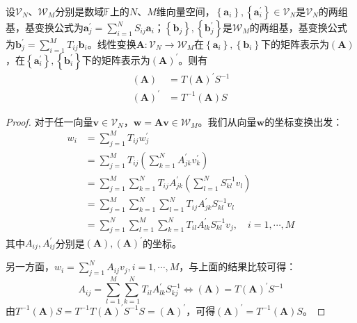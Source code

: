 \documentclass[main.tex]{subfiles}
\begin{document}
\begin{theorem}\label{II.4.14}
设$\mathcal{V}_N$、$\mathcal{W}_M$分别是数域$\mathbb{F}$上的$N$、$M$维向量空间，$\left\{\mathbf{a}_i\right\},\left\{\mathbf{a}^\prime_i\right\}\in\mathcal{V}_N$是$\mathcal{V}_N$的两组基，基变换公式为$\mathbf{a}^\prime_j=\sum_{i=1}^NS_{ij}\mathbf{a}_i$；$\left\{\mathbf{b}_j\right\},\left\{\mathbf{b}^\prime_j\right\}$是$\mathcal{W}_M$的两组基，基变换公式为$\mathbf{b}^\prime_j=\sum_{i=1}^MT_{ij}\mathbf{b}_i$。线性变换$\mathbf{A}:\mathcal{V}_N\rightarrow\mathcal{W}_M$在$\left\{\mathbf{a}_i\right\},\left\{\mathbf{b}_i\right\}$下的矩阵表示为$\left(\mathbf{A}\right)$，在$\left\{\mathbf{a}^\prime_i\right\},\left\{\mathbf{b}^\prime_i\right\}$下的矩阵表示为$\left(\mathbf{A}\right)^\prime$。则有
\begin{align*}
    \left(\mathbf{A}\right)&=T\left(\mathbf{A}\right)^\prime S^{-1}\\
    \left(\mathbf{A}\right)^\prime&=T^{-1}\left(\mathbf{A}\right)S
\end{align*}
\end{theorem}
\begin{proof}
对于任一向量$\mathbf{v}\in\mathcal{V}_N$，$\mathbf{w}=\mathbf{Av}\in\mathcal{W}_M$。我们从向量$\mathbf{w}$的坐标变换出发：
\begin{align*}
    w_i&=\sum_{j=1}^MT_{ij}w^\prime_j\\
    &=\sum_{j=1}^MT_{ij}\left(\sum_{k=1}^NA^\prime_{jk}v^\prime_k\right)\\
    &=\sum_{j=1}^M\sum_{k=1}^NT_{ij}A^\prime_{jk}\left(\sum_{l=1}^NS^{-1}_{kl}v_l\right)\\
    &=\sum_{j=1}^M\sum_{k=1}^N\sum_{l=1}^NT_{ij}A^\prime_{jk}S^{-1}_{kl}v_l\\
    &=\sum_{j=1}^N\sum_{l=1}^M\sum_{k=1}^NT_{il}A^\prime_{lk}S^{-1}_{kl}v_j,\quad i=1,\cdots,M
\end{align*}
其中$A_{ij},A^\prime_{ij}$分别是$\left(\mathbf{A}\right),\left(\mathbf{A}\right)^\prime$的坐标。

另一方面，$w_i=\sum_{j=1}^NA_{ij}v_j,i=1,\cdots,M$，与上面的结果比较可得：
\[
A_{ij}=\sum_{l=1}^M\sum_{k=1}^NT_{il}A^\prime_{lk}S^{-1}_{kj}
\Leftrightarrow \left(\mathbf{A}\right)=T\left(\mathbf{A}\right)^\prime S^{-1}
\]
由$T^{-1}\left(\mathbf{A}\right)S=T^{-1}T\left(\mathbf{A}\right)^\prime S^{-1}S=\left(\mathbf{A}\right)^\prime$，可得$\left(\mathbf{A}\right)^\prime=T^{-1}\left(\mathbf{A}\right)S$。
\end{proof}
\end{document}
